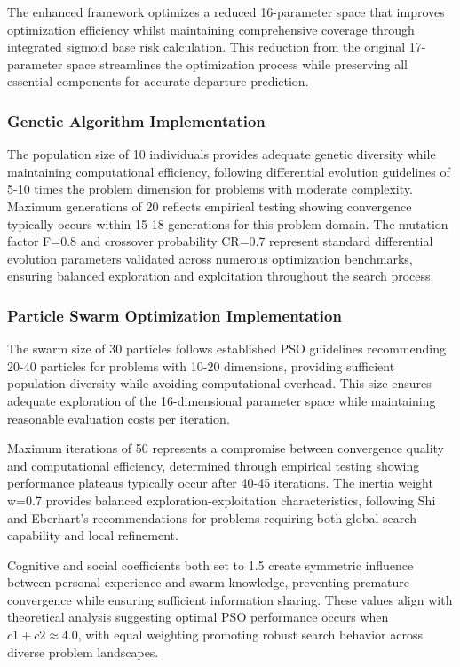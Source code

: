 The enhanced framework optimizes a reduced 16-parameter space that improves optimization efficiency whilst maintaining comprehensive coverage through integrated sigmoid base risk calculation. This reduction from the original 17-parameter space streamlines the optimization process while preserving all essential components for accurate departure prediction.

\subsubsection{Genetic Algorithm Implementation}

The population size of 10 individuals provides adequate genetic diversity while maintaining computational efficiency, following differential evolution guidelines of 5-10 times the problem dimension for problems with moderate complexity. Maximum generations of 20 reflects empirical testing showing convergence typically occurs within 15-18 generations for this problem domain. The mutation factor F=0.8 and crossover probability CR=0.7 represent standard differential evolution parameters validated across numerous optimization benchmarks, ensuring balanced exploration and exploitation throughout the search process.

\subsubsection{Particle Swarm Optimization Implementation}

The swarm size of 30 particles follows established PSO guidelines recommending 20-40 particles for problems with 10-20 dimensions, providing sufficient population diversity while avoiding computational overhead. This size ensures adequate exploration of the 16-dimensional parameter space while maintaining reasonable evaluation costs per iteration.

Maximum iterations of 50 represents a compromise between convergence quality and computational efficiency, determined through empirical testing showing performance plateaus typically occur after 40-45 iterations. The inertia weight w=0.7 provides balanced exploration-exploitation characteristics, following Shi and Eberhart's recommendations for problems requiring both global search capability and local refinement.

Cognitive and social coefficients both set to 1.5 create symmetric influence between personal experience and swarm knowledge, preventing premature convergence while ensuring sufficient information sharing. These values align with theoretical analysis suggesting optimal PSO performance occurs when $c1 + c2 ≈ 4.0$, with equal weighting promoting robust search behavior across diverse problem landscapes.

